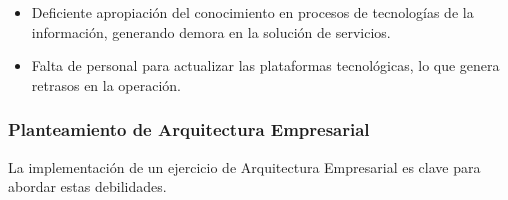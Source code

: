 \documentclass[
	a4paper, %
	12pt, %
]{include/CSSullivanBusinessReport}
\def\tightlist{}
\begin{document}
\begin{itemize}
  \begin{itemize}
  \tightlist
  \item
    Deficiente apropiación del conocimiento en procesos de tecnologías
    de la información, generando demora en la solución de servicios.
  \item
    Falta de personal para actualizar las plataformas tecnológicas, lo
    que genera retrasos en la operación.
  \end{itemize}
\end{itemize}

\subsubsection{Planteamiento de Arquitectura
Empresarial}\label{sec:planteamiento-de-arquitectura-empresarial}

La implementación de un ejercicio de Arquitectura Empresarial es clave
para abordar estas debilidades.
\end{document}
